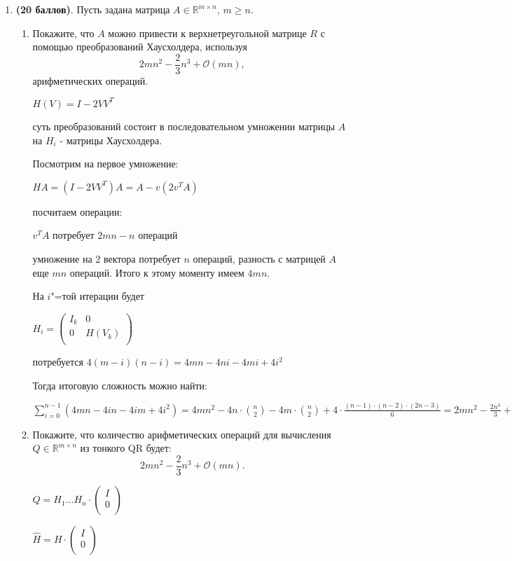 \documentclass[a4paper, 11pt]{article}
\newcommand{\prob}[1]{\item \textbf{(#1 баллов)}.}
\begin{document}
	

\begin{enumerate}
	\prob{20} Пусть задана матрица $A\in\mathbb{R}^{m\times n}$, $m\geq n$. 
	\begin{enumerate}
		\item Покажите, что $A$ можно привести к верхнетреугольной матрице $R$ с помощью преобразований Хаусхолдера, используя 
		\[ 
		2mn^2 - \frac{2}{3} n^3 + \mathcal{O}(mn),
		\]
		арифметических операций. 
		
			$H(V) = I - 2VV^T$
			
			суть преобразований состоит в последовательном умножении матрицы $A$ на $H_i$ - матрицы Хаусхолдера.
			
			Посмотрим на первое умножение:
			
			$HA = (I - 2VV^T)A = A - v(2v^TA)$
			
			посчитаем операции:
			
			$v^TA $ потребует $2mn - n$ операций
			
			умножение на 2 вектора потребует $n$ операций, разность с матрицей $A$ еще $mn$ операций. Итого к этому моменту имеем $4mn$.
			
			На $i$"=той итерации будет 
			
			$H_i = \begin{pmatrix}
				I_k & 0 \\
				0 & H(V_k) \\ 
			\end{pmatrix}$
		
			потребуется $4(m - i)(n - i) = 4mn - 4ni - 4mi + 4i^2$
			
			Тогда итоговую сложность можно найти:
			
			$\displaystyle \sum_{i = 0}^{n - 1} (4mn - 4in - 4im + 4i^2) = 4mn^2 - 4n \cdot \binom{n}{2} - 4m \cdot \binom{n}{2} + 4 \cdot \frac{(n - 1) \cdot (n - 2) \cdot (2n - 3)}{6} = 2mn^2 - \frac{2n^3}{3} + O(mn)$
		
		\item Покажите, что количество арифметических операций для вычисления $Q\in\mathbb{R}^{m\times n}$ из тонкого QR будет:
		\[ 
		2mn^2 - \frac{2}{3} n^3 + \mathcal{O}(mn).
		\]
		
			$Q = H_1 \dots H_n \cdot \begin{pmatrix}
				I \\
				0 \\
			\end{pmatrix}$
		
		$\hat{H} =  H \cdot \begin{pmatrix}
			I \\
			0 \\
		\end{pmatrix}$
	

\end{enumerate}
\end{enumerate}
\end{document}
